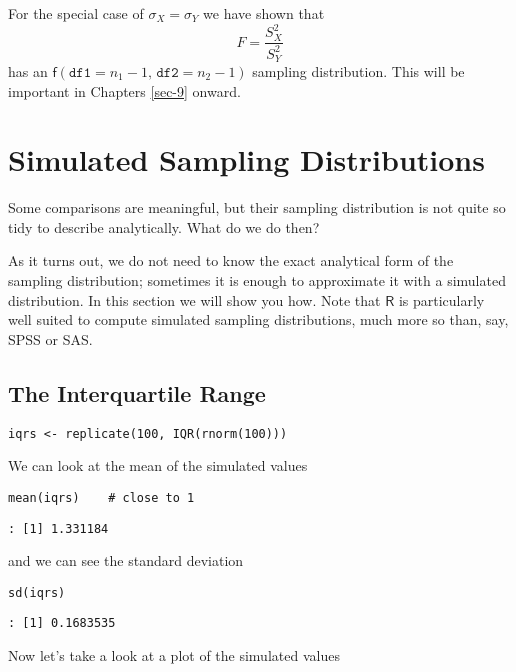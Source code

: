 \begin{rem}
For the special case of \(\sigma_{X}=\sigma_{Y}\) we have shown that
\begin{equation}
F=\frac{S_{X}^{2}}{S_{Y}^{2}}
\end{equation}
has an \(\mathsf{f}(\mathtt{df1}=n_{1}-1,\,\mathtt{df2}=n_{2}-1)\)
sampling distribution. This will be important in Chapters
\ref{sec-9} onward.
\end{rem}

\section{Simulated Sampling Distributions}
\label{sec-8-5}

Some comparisons are meaningful, but their sampling distribution is
not quite so tidy to describe analytically. What do we do then?

As it turns out, we do not need to know the exact analytical form of
the sampling distribution; sometimes it is enough to approximate it
with a simulated distribution. In this section we will show you
how. Note that \(\mathsf{R}\) is particularly well suited to compute
simulated sampling distributions, much more so than, say, SPSS or SAS.

\subsection{The Interquartile Range}
\label{sec-8-5-1}

\begin{verbatim}
iqrs <- replicate(100, IQR(rnorm(100)))
\end{verbatim}

We can look at the mean of the simulated values
\begin{verbatim}
mean(iqrs)    # close to 1
\end{verbatim}

\begin{verbatim}
: [1] 1.331184
\end{verbatim}

and we can see the standard deviation
\begin{verbatim}
sd(iqrs)
\end{verbatim}

\begin{verbatim}
: [1] 0.1683535
\end{verbatim}

Now let's take a look at a plot of the simulated values

